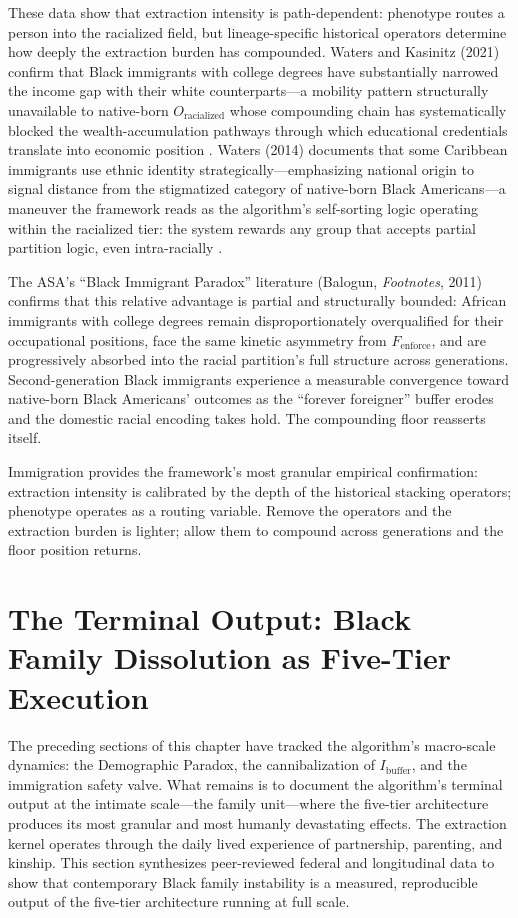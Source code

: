 These data show that extraction intensity is path-dependent: phenotype routes a person into the racialized field, but lineage-specific historical operators determine how deeply the extraction burden has compounded. Waters and Kasinitz (2021) confirm that Black immigrants with college degrees have substantially narrowed the income gap with their white counterparts---a mobility pattern structurally unavailable to native-born $O_{\text{racialized}}$ whose compounding chain has systematically blocked the wealth-accumulation pathways through which educational credentials translate into economic position \cite{waters_kasinitz_2021}. Waters (2014) documents that some Caribbean immigrants use ethnic identity strategically---emphasizing national origin to signal distance from the stigmatized category of native-born Black Americans---a maneuver the framework reads as the algorithm's self-sorting logic operating within the racialized tier: the system rewards any group that accepts partial partition logic, even intra-racially \cite{waters_2014}.

The ASA's ``Black Immigrant Paradox'' literature (Balogun, \textit{Footnotes}, 2011) confirms that this relative advantage is partial and structurally bounded: African immigrants with college degrees remain disproportionately overqualified for their occupational positions, face the same kinetic asymmetry from $F_{\text{enforce}}$, and are progressively absorbed into the racial partition's full structure across generations. Second-generation Black immigrants experience a measurable convergence toward native-born Black Americans' outcomes as the ``forever foreigner'' buffer erodes and the domestic racial encoding takes hold. The compounding floor reasserts itself.

Immigration provides the framework's most granular empirical confirmation: extraction intensity is calibrated by the depth of the historical stacking operators; phenotype operates as a routing variable. Remove the operators and the extraction burden is lighter; allow them to compound across generations and the floor position returns.

\section{The Terminal Output: Black Family Dissolution as Five-Tier Execution}

The preceding sections of this chapter have tracked the algorithm's macro-scale dynamics: the Demographic Paradox, the cannibalization of $I_{\text{buffer}}$, and the immigration safety valve. What remains is to document the algorithm's terminal output at the intimate scale---the family unit---where the five-tier architecture produces its most granular and most humanly devastating effects. The extraction kernel operates through the daily lived experience of partnership, parenting, and kinship. This section synthesizes peer-reviewed federal and longitudinal data to show that contemporary Black family instability is a measured, reproducible output of the five-tier architecture running at full scale.

